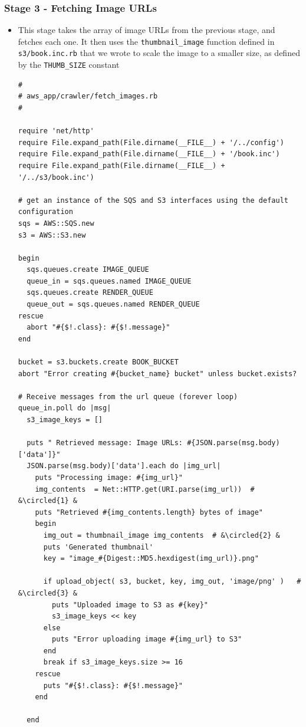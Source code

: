 \documentclass{beamer}
\newcommand*\circled[1]{\tikz[baseline=(char.base)]{
            \node[shape=circle,draw,inner sep=1pt] (char) {#1};}}
\begin{document}
\begin{frame}
\frametitle{Stage 3 - Fetching Image URLs}
\begin{itemize}
\item This stage takes the array of image URLs from the previous stage, and fetches each
one. It then uses the \texttt{thumbnail\_image} function defined in \texttt{s3/book.inc.rb} that we wrote  to scale
the image to a smaller size, as defined by the \texttt{THUMB\_SIZE} constant
\lstset{language=Ruby, style=eclipse}
\begin{lstlisting}
#
# aws_app/crawler/fetch_images.rb
#

require 'net/http'
require File.expand_path(File.dirname(__FILE__) + '/../config')
require File.expand_path(File.dirname(__FILE__) + '/book.inc')
require File.expand_path(File.dirname(__FILE__) + '/../s3/book.inc')

# get an instance of the SQS and S3 interfaces using the default configuration
sqs = AWS::SQS.new
s3 = AWS::S3.new

begin
  sqs.queues.create IMAGE_QUEUE
  queue_in = sqs.queues.named IMAGE_QUEUE
  sqs.queues.create RENDER_QUEUE
  queue_out = sqs.queues.named RENDER_QUEUE
rescue
  abort "#{$!.class}: #{$!.message}"
end

bucket = s3.buckets.create BOOK_BUCKET
abort "Error creating #{bucket_name} bucket" unless bucket.exists?

# Receive messages from the url queue (forever loop)
queue_in.poll do |msg|
  s3_image_keys = []

  puts " Retrieved message: Image URLs: #{JSON.parse(msg.body)['data']}"
  JSON.parse(msg.body)['data'].each do |img_url|
    puts "Processing image: #{img_url}"
    img_contents  = Net::HTTP.get(URI.parse(img_url))  # &\circled{1} &
    puts "Retrieved #{img_contents.length} bytes of image"
    begin
      img_out = thumbnail_image img_contents  # &\circled{2} &
      puts 'Generated thumbnail'
      key = "image_#{Digest::MD5.hexdigest(img_url)}.png"

      if upload_object( s3, bucket, key, img_out, 'image/png' )   # &\circled{3} &
        puts "Uploaded image to S3 as #{key}"
        s3_image_keys << key
      else
        puts "Error uploading image #{img_url} to S3"
      end
      break if s3_image_keys.size >= 16
    rescue
      puts "#{$!.class}: #{$!.message}"
    end

  end


\end{lstlisting}
\end{itemize}
\end{frame}
\end{document}
